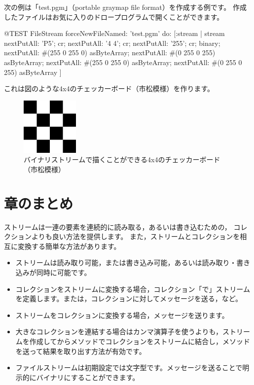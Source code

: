 \documentclass[a4paper,10pt,twoside]{book}
\begin{document}
次の例は「test.pgm」（portable graymap file format）を作成する例です。
作成したファイルはお気に入りのドロープログラムで開くことができます。


\begin{code}{@TEST}
FileStream
  forceNewFileNamed: 'test.pgm' 
  do: [:stream |
	stream
		nextPutAll: 'P5'; cr;
		nextPutAll: '4 4'; cr;
		nextPutAll: '255'; cr;
		binary;
		nextPutAll: #(255 0 255 0) asByteArray;
		nextPutAll: #(0 255 0 255) asByteArray;
		nextPutAll: #(255 0 255 0) asByteArray;
		nextPutAll: #(0 255 0 255) asByteArray
	]
\end{code}

これは図のような4x4のチェッカーボード（市松模様）を作ります。

\begin{figure}[!ht]
\centerline{\includegraphics[width=0.25\textwidth]{checkerboard4x4}}
\caption{バイナリストリームで描くことができる4x4のチェッカーボード（市松模様）}
\vspace{.2in}
\end{figure}

\section{章のまとめ}

ストリームは一連の要素を連続的に読み取る，あるいは書き込むための，
コレクションよりも良い方法を提供します。
また，ストリームとコレクションを相互に変換する簡単な方法があります。
\begin{itemize}
  \item ストリームは読み取り可能，または書き込み可能，あるいは読み取り・書き込みが同時に可能です。
  \item コレクションをストリームに変換する場合，コレクション「で」ストリームを定義します。\eg {}または，コレクションに対してメッセージを送る，など。
  \item ストリームをコレクションに変換する場合，メッセージを送ります。
  \item 大きなコレクションを連結する場合はカンマ演算子を使うよりも，ストリームを作成してからメソッドでコレクションをストリームに結合し，メソッドを送って結果を取り出す方法が有効です。
  \item ファイルストリームは初期設定では文字型です。メッセージを送ることで明示的にバイナリにすることができます。
\end{itemize}

\ifx\wholebook\relax\else
\end{document}
